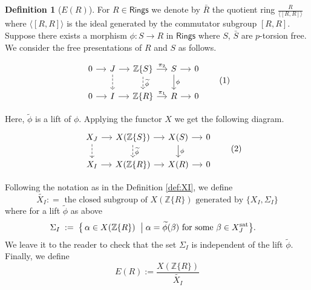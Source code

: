 \documentclass[11pt]{amsart}
\theoremstyle{plain}
\theoremstyle{definition}
\newtheorem{definition}[thm]{Definition}
\renewcommand{\tilde}{\widetilde}
\newcommand{\Z}{{\mathbb Z}}
\newcommand{\ab}[1]{\langle {#1} \rangle}
\newcommand{\Rings}{{\mathsf{Rings}}}
\begin{document}
\begin{definition}[$E(R)$]\label{def:e}
For $R \in \Rings$ we denote by $\bar{R}$ the quotient ring $\frac{R}{\ab{[R,R]}}$ where $\ab{[R,R]}$ is the ideal generated by the commutator subgroup $[R,R]$. Suppose there exists a morphism $\phi: S \to R$ in $\Rings$ where $S$, $\bar{S}$ are $p$-torsion free. We consider the free presentations of $R$ and $S$ as follows. 

\[
\begin{tikzcd}[column sep=small, row sep=1.5em]
0 \arrow[r] & J \arrow[d, dashed] \arrow[r] & \Z\{S\} \arrow[d, dashed,"\tilde{\phi}"] \arrow[r, "\pi_2"] & S \arrow[d, "\phi"] \arrow[r] & 0 \\
0 \arrow[r] & I \arrow[r] & \Z\{R\} \arrow[r, "\pi_1"] & R \arrow[r] & 0
\end{tikzcd}
\tag{1}
\] 

Here, $\tilde{\phi}$ is a lift of $\phi$. Applying the functor $X$ we get the following diagram.
\[
\begin{tikzcd}[column sep=small, row sep=1.5em]
 & X_J \arrow[d, dashed] \arrow[r] & X(\Z\{S\}) \arrow[d, dashed,"\tilde{\phi}"] \arrow[r] & X(S) \arrow[d, "\phi"] \arrow[r] & 0 \\
 & X_I \arrow[r] & X(\Z\{R\}) \arrow[r] & X(R) \arrow[r] & 0
\end{tikzcd}
\tag{2}
\] 

Following the notation as in the Definition \ref{def:XI}, we define 
$$\tilde{X_I} : = \text{ the closed subgroup of } X(\Z\{R\}) \text{ generated by  } \{X_I, \Sigma_I\}$$
where for a lift $\tilde{\phi}$ as above
\[
\begin{aligned}
\Sigma_I \;:=\; \bigl\{\, \alpha \in X(\Z\{R\}) \ \bigm|\;
&  \alpha = \tilde{\phi}(\beta) \text{ for some } \beta \in X_J^{\mathrm{sat}}
\bigr\}.
\end{aligned}
\]
We leave it to the reader to check that the set $\Sigma_I$ is independent of the lift $\tilde{\phi}$.
Finally, we define $$E(R):= \frac{X(\Z\{R\})}{\tilde{X_I}}$$ 
\end{definition}
\end{document}
